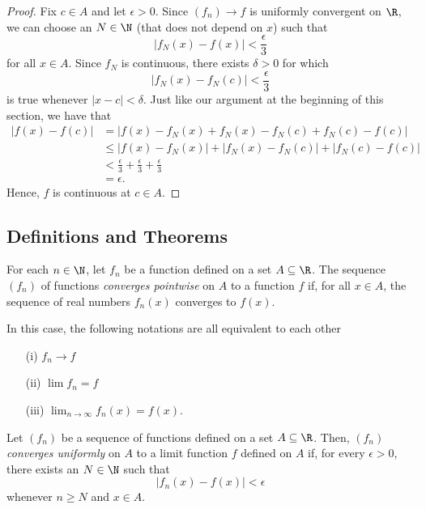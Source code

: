 \begin{proof}
Fix \( c \in A  \) and let \( \epsilon > 0  \). Since \( (f_n) \to f   \) is uniformly convergent on \( \R  \), we can choose an \( N \in \N   \) (that does not depend on \( x  \)) such that 
\[  | f_N(x) - f(x)  | < \frac{ \epsilon  }{ 3  }  \]
for all \( x \in A  \). Since \( f_N  \) is continuous, there exists \( \delta > 0  \) for which 
\[  | f_N(x) - f_N(c)  | < \frac{ \epsilon  }{ 3 }  \]
is true whenever \( | x - c  | < \delta  \). Just like our argument at the beginning of this section, we have that
\begin{align*}
    | f(x) - f(c)  | &= | f(x) - f_N(x) + f_N(x) - f_N(c) + f_N(c) - f(c)  |  \\
                     &\leq | f(x) - f_N(x)  | + | f_N(x) - f_N(c)  | + | f_N(c) - f(c)  | \\
                     &< \frac{ \epsilon  }{ 3  } + \frac{ \epsilon  }{ 3 } + \frac{ \epsilon  }{ 3  } \\
                     &= \epsilon.
\end{align*}
Hence, \( f  \) is continuous at \( c \in  A  \).
\end{proof}




\subsection{Definitions and Theorems}


\begin{tcolorbox}
\begin{defn}
For each \( n \in \N  \), let \( f_n \) be a function defined on a set \( A \subseteq \R  \). The sequence \( (f_n)  \) of functions \textit{converges pointwise }  on \( A  \) to a function \( f  \) if, for all \( x \in A  \), the sequence of real numbers \( f_n(x)  \) converges to \( f(x)  \). 

In this case, the following notations are all equivalent to each other
\begin{enumerate}
    \item[(i)] \( f_n \to f  \) 
    \item[(ii)] \( \lim f_n = f  \)
    \item[(iii)] \( \lim_{ n \to \infty  } f_n(x) = f(x)  \).
\end{enumerate}
\end{defn}
\end{tcolorbox}


\begin{tcolorbox}
    \begin{defn}
    Let \( (f_n)  \) be a sequence of functions defined on a set \( A \subseteq \R  \). Then, \( (f_n)  \) \textit{converges uniformly} on \( A  \) to a limit function \( f  \) defined on \( A  \) if, for every \( \epsilon  > 0 \), there exists an \( N \in \N  \) such that 
    \[  | f_n(x) - f(x)  | < \epsilon   \]
    whenever \( n \geq N  \) and \( x \in A  \).
    \end{defn}
\end{tcolorbox}


